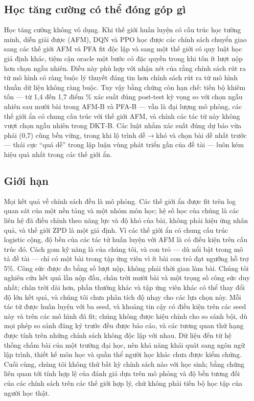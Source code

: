 \documentclass[a4paper,preprint,12pt,authoryear]{elsarticle}
\begin{document}
\subsection{Học tăng cường có thể đóng góp gì}

Học tăng cường không vô dụng. Khi thế giới huấn luyện có cấu trúc học tường minh, diễn giải được (AFM), DQN và PPO học được các chính sách chuyển giao sang các thế giới AFM và PFA fit độc lập và sang một thế giới có quy luật học giả định khác, tiệm cận oracle một bước có đặc quyền trong khi tốn ít lượt nộp hơn chọn ngẫu nhiên. Điều này phù hợp với nhận xét của \citet{doroudi2019reward} rằng chính sách rút ra từ mô hình có ràng buộc lý thuyết đáng tin hơn chính sách rút ra từ mô hình thuần dữ liệu không ràng buộc. Tuy vậy bằng chứng còn hạn chế: tiến bộ khiêm tốn — từ 1{,}4 đến 1{,}7 điểm \% xác suất đúng post-test kỳ vọng so với chọn ngẫu nhiên sau mười bài trong AFM-B và PFA-B — vẫn là đại lượng mô phỏng, các thế giới ẩn có chung cấu trúc với thế giới AFM, và chính các tác tử này không vượt chọn ngẫu nhiên trong DKT-B. Các luật nhắm xác suất đúng dự báo vừa phải (0,7) cũng bền vững, trong khi lộ trình dễ$\to$khó và chọn bài dễ nhất trước — thái cực ``quá dễ'' trong lập luận vùng phát triển gần của đề tài — luôn kém hiệu quả nhất trong các thế giới ẩn.

\subsection{Giới hạn}

Mọi kết quả về chính sách đều là mô phỏng. Các thế giới ẩn được fit trên log quan sát của một nền tảng và một nhóm môn học; hệ số học của chúng là các liên hệ đã điều chỉnh theo năng lực và độ khó của bài, không phải hiệu ứng nhân quả, và thế giới ZPD là một giả định. Vì các thế giới ẩn có chung cấu trúc logistic cộng, độ bền của các tác tử huấn luyện với AFM là có điều kiện trên cấu trúc đó. Cách gom kỹ năng là của chúng tôi, và con trỏ — dù nổi bật trong mô tả đề tài — chỉ có một bài trong tập ứng viên vì ít bài con trỏ đạt ngưỡng hỗ trợ 5\%. Công sức được đo bằng số lượt nộp, không phải thời gian làm bài. Chúng tôi nghiên cứu kết quả lần nộp đầu, chân trời mười bài và một trọng số công sức duy nhất; chân trời dài hơn, phần thưởng khác và tập ứng viên khác có thể thay đổi độ lớn kết quả, và chúng tôi chưa phân tích độ nhạy cho các lựa chọn này. Mỗi tác tử được huấn luyện với ba seed, và khoảng tin cậy có điều kiện trên các seed này và trên các mô hình đã fit; chúng không được hiệu chỉnh cho so sánh bội, dù mọi phép so sánh đăng ký trước đều được báo cáo, và các tương quan thứ hạng được tính trên những chính sách không độc lập với nhau. Dữ liệu đến từ hệ thống chấm bài của một trường đại học, nên khả năng khái quát sang ngôn ngữ lập trình, thiết kế môn học và quần thể người học khác chưa được kiểm chứng. Cuối cùng, chúng tôi không thử bất kỳ chính sách nào với học sinh; bằng chứng liên quan tới tính hợp lệ của đánh giá dựa trên mô phỏng và độ bền tương đối của các chính sách trên các thế giới hợp lý, chứ không phải tiến bộ học tập của người học thật.
\end{document}
